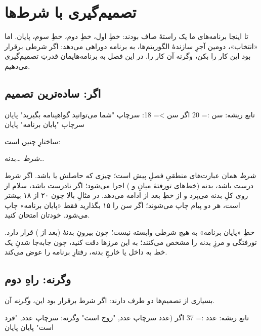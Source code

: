 \chapter{تصمیم‌گیری با شرط‌ها}%
\label{ch:conditionals}

تا اینجا برنامه‌های ما یک راستهٔ صاف بودند: خطِ اول، خطِ دوم، خطِ سوم، پایان.
اما «انتخاب»، دومین آجرِ سازندهٔ الگوریتم‌ها، به برنامه دوراهی می‌دهد: اگر
شرطی برقرار بود این کار را بکن، وگرنه آن کار را. در این فصل به برنامه‌هایمان
قدرتِ تصمیم‌گیری می‌دهیم.

\section{اگر: ساده‌ترین تصمیم}

\begin{salamfa}
تابع ریشه:
    سن := 20
    اگر سن >= 18:
        سرچاپ "شما می‌توانید گواهینامه بگیرید"
    پایان
    سرچاپ "پایان برنامه"
پایان
\end{salamfa}

ساختارِ  چنین است:

\begin{center}
 \;\textit{شرط}\; \code{:} \quad\ldots\;بدنه\;\ldots\quad {}
\end{center}

\emph{شرط} همان عبارت‌های منطقیِ فصلِ پیش است؛ چیزی که حاصلش  یا
 باشد. اگر شرط درست باشد، بدنه (خط‌های تورفتهٔ میانِ 
و ) اجرا می‌شود؛ اگر نادرست باشد، سلام از روی کلِ بدنه می‌پرد و
از خطِ بعد از  ادامه می‌دهد. در مثالِ بالا چون ۲۰ از ۱۸ بیشتر
است، هر دو پیام چاپ می‌شوند؛ اگر سن را ۱۵ بگذارید فقط «پایان برنامه» چاپ
می‌شود. خودتان امتحان کنید.

\begin{note}
خطِ «پایان برنامه» به هیچ شرطی وابسته نیست؛ چون بیرونِ بدنهٔ 
(بعد از ) قرار دارد. تورفتگی و  مرزِ بدنه را مشخص
می‌کنند؛ به این مرزها دقت کنید، چون جابه‌جا شدنِ یک خط به داخل یا خارجِ
بدنه، رفتارِ برنامه را عوض می‌کند.
\end{note}

\section{وگرنه: راهِ دوم}

بسیاری از تصمیم‌ها دو طرف دارند: اگر شرط برقرار بود این، \emph{وگرنه} آن.

\begin{salamfa}
تابع ریشه:
    عدد := 37
    اگر (عدد %
        سرچاپ عدد, "زوج است"
    وگرنه:
        سرچاپ عدد, "فرد است"
    پایان
پایان
\end{salamfa}

